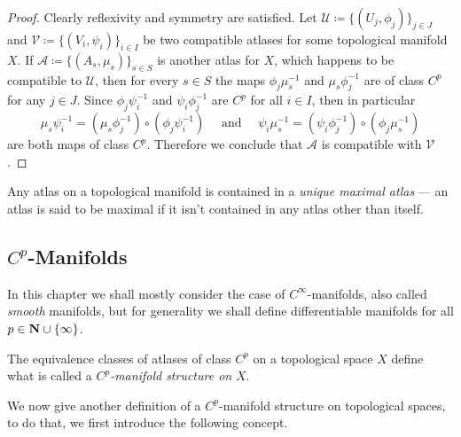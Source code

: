 \begin{proof}
Clearly reflexivity and symmetry are satisfied. Let
\(\mathcal{U} \coloneq \{(U_{j}, \phi_j)\}_{j \in J}\) and
\(\mathcal{V} \coloneq \{(V_{i}, \psi_i)\}_{i \in I}\) be two compatible atlases
for some topological manifold \(X\). If
\(\mathcal{A} \coloneq \{(A_{s}, \mu_s)\}_{s \in S}\) is another atlas for
\(X\), which happens to be compatible to \(\mathcal{U}\), then for every
\(s \in S\) the maps \(\phi_j \mu_{s}^{-1}\) and \(\mu_s \phi_j^{-1}\)
are of class \(C^p\) for any \(j \in J\). Since \(\phi_j \psi_i^{-1}\) and
\(\psi_i \phi_j^{-1}\) are \(C^p\) for all \(i \in I\), then in particular
\[
\mu_s \psi_i^{-1} = (\mu_s \phi_j^{-1}) \circ (\phi_j \psi_i^{-1})
\quad\text{ and }\quad
\psi_i \mu_s^{-1} = (\psi_i \phi_j^{-1}) \circ (\phi_j \mu_s^{-1})
\]
are both maps of class \(C^p\). Therefore we conclude that \(\mathcal{A}\) is
compatible with \(\mathcal{V}\).
\end{proof}

\begin{corollary}
\label{cor:unique-maximal-atlas}
Any atlas on a topological manifold is contained in a \emph{unique maximal
  atlas} --- an atlas is said to be maximal if it isn't contained in any atlas
other than itself.
\end{corollary}

\subsection{\texorpdfstring{\(C^p\)}{Cp}-Manifolds}

In this chapter we shall mostly consider the case of \(C^{\infty}\)-manifolds,
also called \emph{smooth} manifolds, but for generality we shall define
differentiable manifolds for all \(p \in \mathbf{N} \cup \{\infty\}\).

\begin{definition}
\label{def:Cp-manifold}
The equivalence classes of atlases of class \(C^p\) on a topological space \(X\)
define what is called a \emph{\(C^p\)-manifold structure on} \(X\).
\end{definition}

We now give another definition of a \(C^p\)-manifold structure on topological
spaces, to do that, we first introduce the following concept.

